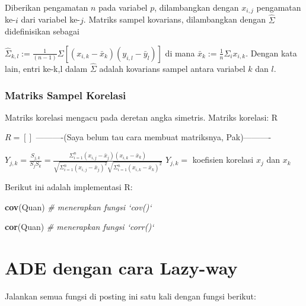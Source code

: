 \documentclass[
]{book}
\newenvironment{Shaded}{\begin{snugshade}}{\end{snugshade}}
\newcommand{\CommentTok}[1]{\textcolor[rgb]{0.56,0.35,0.01}{\textit{#1}}}
\newcommand{\KeywordTok}[1]{\textcolor[rgb]{0.13,0.29,0.53}{\textbf{#1}}}
\newcommand{\NormalTok}[1]{#1}
\begin{document}
Diberikan pengamatan \(n\) pada variabel \(p\), dilambangkan dengan \(x_{i,j}\) pengamatan ke-\(i\) dari variabel ke-\(j\). Matriks sampel kovarians, dilambangkan dengan \(\hat{\Sigma}\) didefinisikan sebagai

\(\hat{\Sigma}_{k,l}:=\frac{1}{(n-1)}{\Sigma[(x_{i,k}-\bar{x}_k)(y_{i,l}-\bar{y}_l)]}\)
di mana \(\bar{x}_k:=\frac{1}{n}\Sigma_ix_{i,k}\). Dengan kata lain, entri ke-k,l dalam \(\hat{\Sigma}\) adalah kovarians sampel antara variabel \(k\) dan \(l\).

\hypertarget{matriks-sampel-korelasi}{%
\subsubsection*{Matriks Sampel Korelasi}\label{matriks-sampel-korelasi}}

Matriks korelasi mengacu pada deretan angka simetris.
Matriks korelasi: R

\(R=[]\) ----------(Saya belum tau cara membuat matriksnya, Pak)----------

\(Y_{j,k}=\frac{S_{j,k}}{S_jS_k}=\frac{\Sigma^{n}_{i=1}(x_{i,j}-\bar{x}_j)(x_{i,k}-\bar{x}_k)}{\sqrt{\Sigma^n_{i=1}{(x_{i,j}-\bar{x}_j)^2}}\sqrt{\Sigma^n_{i=1}(x_{i,k}-\bar{x}_k)^2}}\)
\(Y_{j,k}=\) koefisien korelasi \(x_j\) dan \(x_k\)

Berikut ini adalah implementasi R:

\begin{Shaded}
\begin{Highlighting}[]
\KeywordTok{cov}\NormalTok{(Quan)                                           }\CommentTok{# menerapkan fungsi `cov()`}
\end{Highlighting}
\end{Shaded}

\begin{Shaded}
\begin{Highlighting}[]
\KeywordTok{cor}\NormalTok{(Quan)                                           }\CommentTok{# menerapkan fungsi `corr()`}
\end{Highlighting}
\end{Shaded}

\hypertarget{ade-dengan-cara-lazy-way}{%
\section{ADE dengan cara Lazy-way}\label{ade-dengan-cara-lazy-way}}

Jalankan semua fungsi di posting ini satu kali dengan fungsi berikut:
\end{document}
